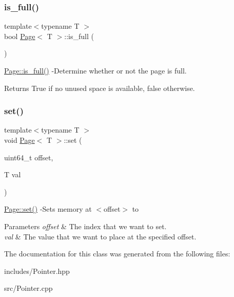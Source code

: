 \subsubsection{\texorpdfstring{is\+\_\+full()}{is\_full()}}
{\footnotesize\ttfamily template$<$typename T $>$ \\
bool \hyperlink{class_page}{Page}$<$ T $>$\+::is\+\_\+full (\begin{DoxyParamCaption}{ }\end{DoxyParamCaption})}

\hyperlink{class_page_a8c27abd6fb2ce55c05b065584b4bcc75}{Page\+::is\+\_\+full()} -\/\+Determine whether or not the page is full. \begin{DoxyReturn}{Returns}
True if no unused space is available, false otherwise. 
\end{DoxyReturn}
\mbox{\label{class_page_a4de67b2afdfe14758388f745a8a99d56}} 
\subsubsection{\texorpdfstring{set()}{set()}}
{\footnotesize\ttfamily template$<$typename T $>$ \\
void \hyperlink{class_page}{Page}$<$ T $>$\+::set (\begin{DoxyParamCaption}\item[{uint64\+\_\+t}]{offset,  }\item[{T}]{val }\end{DoxyParamCaption})}

\hyperlink{class_page_a4de67b2afdfe14758388f745a8a99d56}{Page\+::set()} -\/\+Sets memory at $<$offset$>$ to 


\begin{DoxyParams}{Parameters}
{\em offset} & The index that we want to set. \\
\hline
{\em val} & The value that we want to place at the specified offset. \\
\hline
\end{DoxyParams}


The documentation for this class was generated from the following files\+:\begin{DoxyCompactItemize}
\item 
includes/Pointer.\+hpp\item 
src/Pointer.\+cpp\end{DoxyCompactItemize}
